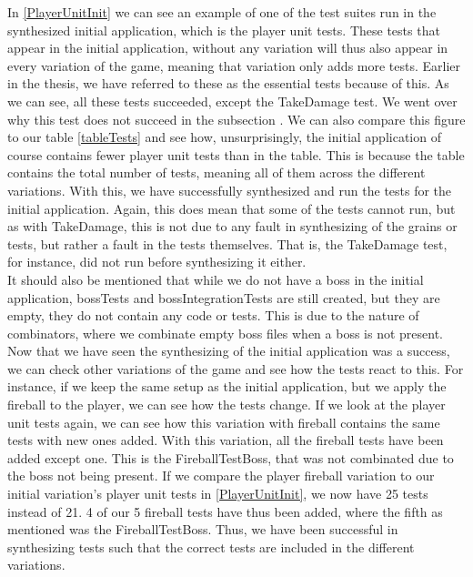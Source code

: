 In \autoref{PlayerUnitInit} we can see an example of one of the test suites run in the synthesized initial application, which is the player unit tests. These tests that appear in the initial application, without any variation will thus also appear in every variation of the game, meaning that variation only adds more tests. Earlier in the thesis, we have referred to these as the essential tests because of this.
As we can see, all these tests succeeded, except the TakeDamage test. We went over why this test does not succeed in the subsection . We can also compare this figure to our table \autoref{tableTests} and see how, unsurprisingly, the initial application of course contains fewer player unit tests than in the table. This is because the table contains the total number of tests, meaning all of them across the different variations. With this, we have successfully synthesized and run the tests for the initial application. Again, this does mean that some of the tests cannot run, but as with TakeDamage, this is not due to any fault in synthesizing of the grains or tests, but rather a fault in the tests themselves. That is, the TakeDamage test, for instance, did not run before synthesizing it either. \\
It should also be mentioned that while we do not have a boss in the initial application, bossTests and bossIntegrationTests are still created, but they are empty, they do not contain any code or tests. This is due to the nature of combinators, where we combinate empty boss files when a boss is not present. \\
Now that we have seen the synthesizing of the initial application was a success, we can check other variations of the game and see how the tests react to this. For instance, if we keep the same setup as the initial application, but we apply the fireball to the player, we can see how the tests change. If we look at the player unit tests again, we can see how this variation with fireball contains the same tests with new ones added. With this variation, all the fireball tests have been added except one. This is the FireballTestBoss, that was not combinated due to the boss not being present. If we compare the player fireball variation to our initial variation's player unit tests in \autoref{PlayerUnitInit}, we now have 25 tests instead of 21. 4 of our 5 fireball tests have thus been added, where the fifth as mentioned was the FireballTestBoss. Thus, we have been successful in synthesizing tests such that the correct tests are included in the different variations. %
